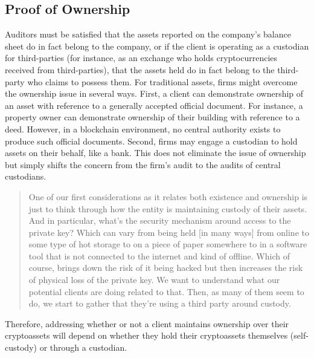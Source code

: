 \subsection{Proof of Ownership}\label{sec:auditing:framework:ownership}

Auditors must be satisfied that the assets reported on the company's balance sheet do in fact belong to the company, or if the client is operating as a custodian for third-parties (for instance, as an exchange who holds cryptocurrencies received from third-parties), that the assets held do in fact belong to the third-party who claims to possess them. For traditional assets, firms might overcome the ownership issue in several ways. First, a client can demonstrate ownership of an asset with reference to a generally accepted official document. For instance, a property owner can demonstrate ownership of their building with reference to a deed. However, in a blockchain environment, no central authority exists to produce such official documents. Second, firms may engage a custodian to hold assets on their behalf, like a bank. This does not eliminate the issue of ownership but simply shifts the concern from the firm's audit to the audits of central custodians.

\begin{quote}
One of our first considerations as it relates both existence and ownership is just to think through how the entity is maintaining custody of their assets. And in particular, what's the security mechanism around access to the private key? Which can vary from being held [in many ways] from online to some type of hot storage to on a piece of paper somewhere to in a software tool that is not connected to the internet and kind of offline. Which of course, brings down the risk of it being hacked but then increases the risk of physical loss of the private key. We want to understand what our potential clients are doing related to that. Then, as many of them seem to do, we start to gather that they're using a third party around custody.~\cite{pimentel2021systemizing}
\end{quote}

Therefore, addressing whether or not a client maintains ownership over their cryptoassets will depend on whether they hold their cryptoassets themselves (self-custody) or through a custodian.


